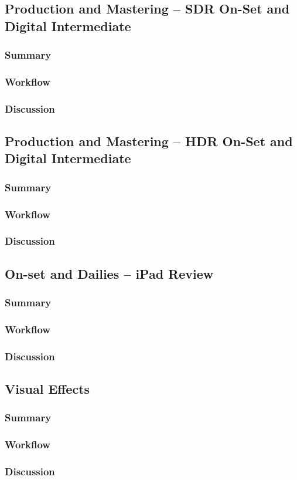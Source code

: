 \subsection{Production and Mastering -- SDR On-Set and Digital Intermediate}
\subsubsection{Summary}
\subsubsection{Workflow}
\subsubsection{Discussion}

\subsection{Production and Mastering -- HDR On-Set and Digital Intermediate}
\subsubsection{Summary}
\subsubsection{Workflow}
\subsubsection{Discussion}

\subsection{On-set and Dailies -- iPad Review}
\subsubsection{Summary}
\subsubsection{Workflow}
\subsubsection{Discussion}

\subsection{Visual Effects}
\subsubsection{Summary}
\subsubsection{Workflow}
\subsubsection{Discussion}






